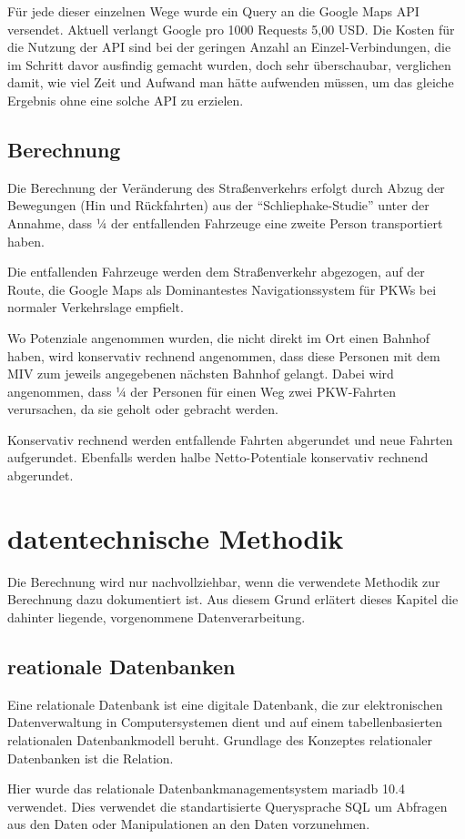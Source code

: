 \documentclass[fontsize=12pt,a4paper]{scrreprt}
\begin{document}
Für jede dieser einzelnen Wege wurde ein Query an die Google Maps API versendet. Aktuell verlangt Google pro 1000 Requests 5,00 USD. Die Kosten für die Nutzung der API sind bei der geringen Anzahl an Einzel-Verbindungen, die im Schritt davor ausfindig gemacht wurden, doch sehr überschaubar, verglichen damit, wie viel Zeit und Aufwand man hätte aufwenden müssen, um das gleiche Ergebnis ohne eine solche API zu erzielen.
        \section{Berechnung}
Die Berechnung der Veränderung des Straßenverkehrs erfolgt durch Abzug der Bewegungen (Hin und Rückfahrten) aus der \enquote{Schliephake-Studie} unter der Annahme, dass ¼ der entfallenden Fahrzeuge eine zweite Person transportiert haben.

Die entfallenden Fahrzeuge werden dem Straßenverkehr abgezogen, auf der Route, die Google Maps als Dominantestes Navigationssystem für PKWs bei normaler Verkehrslage empfielt.

Wo Potenziale angenommen wurden, die nicht direkt im Ort einen Bahnhof haben, wird konservativ rechnend angenommen, dass diese Personen mit dem MIV zum jeweils angegebenen nächsten Bahnhof gelangt. Dabei wird angenommen, dass ¼ der Personen für einen Weg zwei PKW-Fahrten verursachen, da sie geholt oder gebracht werden.

Konservativ rechnend werden entfallende Fahrten abgerundet und neue Fahrten aufgerundet. Ebenfalls werden halbe Netto-Potentiale konservativ rechnend abgerundet.


    \chapter{datentechnische Methodik}
Die Berechnung wird nur nachvollziehbar, wenn die verwendete Methodik zur Berechnung dazu dokumentiert ist. Aus diesem Grund erlätert dieses Kapitel die dahinter liegende, vorgenommene Datenverarbeitung.
        \section{reationale Datenbanken}
Eine relationale Datenbank ist eine digitale Datenbank, die zur elektronischen Datenverwaltung in Computersystemen dient und auf einem tabellenbasierten relationalen Datenbankmodell beruht. Grundlage des Konzeptes relationaler Datenbanken ist die Relation.

Hier wurde das relationale Datenbankmanagementsystem mariadb 10.4 verwendet. Dies verwendet die standartisierte Querysprache SQL um Abfragen aus den Daten oder Manipulationen an den Daten vorzunehmen.
\end{document}
